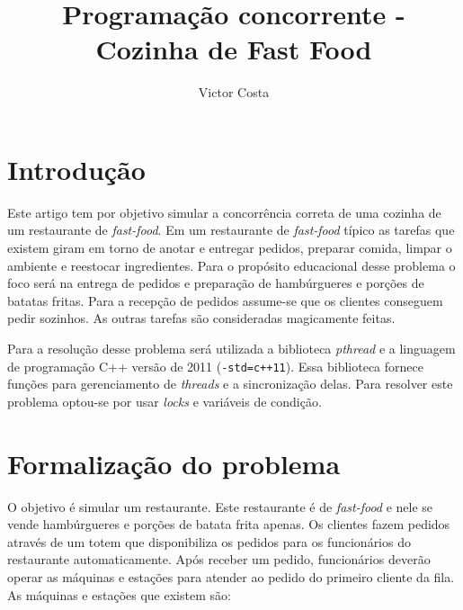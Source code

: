 \documentclass[a4paper]{article}
\title{Programação concorrente - Cozinha de Fast Food}
\author{Victor Costa}
\begin{document}
\maketitle

\section{Introdução}

Este artigo tem por objetivo simular a concorrência correta de uma cozinha de um restaurante de \textit{fast-food}. Em um restaurante de \textit{fast-food} típico as tarefas que existem giram em torno de anotar e entregar pedidos, preparar comida, limpar o ambiente e reestocar ingredientes. Para o propósito educacional desse problema o foco será na entrega de pedidos e preparação de hambúrgueres e porções de batatas fritas. Para a recepção de pedidos assume-se que os clientes conseguem pedir sozinhos. As outras tarefas são consideradas magicamente feitas.

Para a resolução desse problema será utilizada a biblioteca \textit{pthread} e a linguagem de programação C++ versão de 2011 (\texttt{-std=c++11}). Essa biblioteca fornece funções para gerenciamento de \textit{threads} e a sincronização delas. Para resolver este problema optou-se por usar \textit{locks} e variáveis de condição.

\section{Formalização do problema}

O objetivo é simular um restaurante. Este restaurante é de \textit{fast-food} e nele se vende hambúrgueres e porções de batata frita apenas. Os clientes fazem pedidos através de um totem que disponibiliza os pedidos para os funcionários do restaurante automaticamente. Após receber um pedido, funcionários deverão operar as máquinas e estações para atender ao pedido do primeiro cliente da fila. As máquinas e estações que existem são:
\end{document}
